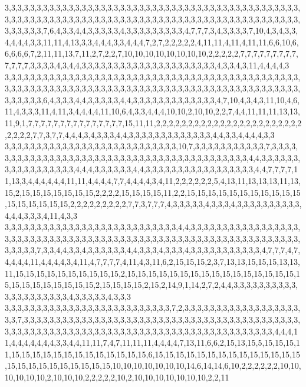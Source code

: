 3,3,3,3,3,3,3,3,3,3,3,3,3,3,3,3,3,3,3,3,3,3,3,3,3,3,3,3,3,3,3,3,3,3,3,3,3,3,3,3,3,3,3,3,3,3,3,3,3,3,3,3,3,3,3,3,3,3,3,3,3,3,3,3,3,3,3,3,3,3,3,3,3,3,3,3,3,3,3,3,3,3,3,3,3,3,3,3,3,3,3,3,3,3,3,3,3,3,7,6,4,3,3,4,4,3,3,3,3,3,4,3,3,3,3,3,3,3,3,3,4,7,7,7,3,4,3,3,3,3,7,10,4,3,4,3,3,4,4,4,4,3,3,11,11,4,13,3,3,4,4,4,3,3,4,4,4,7,2,7,2,2,2,2,2,4,11,11,4,11,4,11,11,6,6,10,6,6,6,6,6,7,2,11,11,13,7,11,2,7,2,2,7,10,10,10,10,10,10,10,10,2,2,2,2,2,7,7,7,7,7,7,7,7,7,7,7,7,7,3,3,3,3,4,3,4,4,3,3,3,3,3,3,3,3,3,3,3,3,3,3,3,3,3,3,3,3,3,4,3,3,4,3,11,4,4,4,4,3
3,3,3,3,3,3,3,3,3,3,3,3,3,3,3,3,3,3,3,3,3,3,3,3,3,3,3,3,3,3,3,3,3,3,3,3,3,3,3,3,3,3,3,3,3,3,3,3,3,3,3,3,3,3,3,3,3,3,3,3,3,3,3,3,3,3,3,3,3,3,3,3,3,3,3,3,3,3,3,3,3,3,3,3,3,3,3,3,3,3,3,3,3,3,3,3,3,3,6,4,3,3,3,4,4,3,3,3,3,3,4,4,3,3,3,3,3,3,3,3,3,3,3,3,3,4,7,10,4,3,4,3,11,10,4,6,11,4,3,3,3,11,4,11,3,4,4,4,4,11,10,6,4,3,3,4,4,4,10,10,2,10,10,2,2,7,4,4,11,11,11,13,13,11,9,1,7,7,7,7,7,7,7,7,7,7,7,7,7,7,7,15,11,11,2,2,2,2,2,2,2,2,2,2,2,2,2,2,2,2,2,2,2,2,2,2,2,2,2,2,2,7,7,3,7,7,4,4,4,3,4,3,3,3,4,4,3,3,3,3,3,3,3,3,3,3,3,3,3,4,4,3,3,4,4,4,4,3,3
3,3,3,3,3,3,3,3,3,3,3,3,3,3,3,3,3,3,3,3,3,3,3,3,3,3,3,10,7,3,3,3,3,3,3,3,3,3,3,3,7,3,3,3,3,3,3,3,3,3,3,3,3,3,3,3,3,3,3,3,3,3,3,3,3,3,3,3,3,3,3,3,3,3,3,3,3,3,3,3,3,3,3,4,4,3,3,3,3,3,3,3,3,3,3,3,3,3,3,3,3,3,4,4,4,3,3,3,3,3,3,4,4,3,3,3,3,3,3,3,3,3,3,3,3,3,3,3,3,3,4,4,7,7,7,7,11,13,3,4,4,4,4,4,4,11,11,4,4,4,4,7,7,4,4,4,4,3,4,11,2,2,2,2,2,2,5,4,13,11,13,13,13,11,13,15,2,15,15,15,15,15,15,15,2,2,2,2,15,15,15,15,11,2,2,15,15,15,15,15,15,15,15,15,15,15,15,15,15,15,15,15,2,2,2,2,2,2,2,2,2,7,7,3,7,7,7,4,3,3,3,3,3,4,3,3,3,4,3,3,3,3,3,3,3,3,3,3,4,4,4,3,3,3,4,11,4,3,3
3,3,3,3,3,3,3,3,3,3,3,3,3,3,3,3,3,3,3,3,3,3,3,3,3,3,3,4,4,3,3,3,3,3,3,3,3,3,3,3,3,3,3,3,3,3,3,3,3,3,3,3,3,3,3,3,3,3,3,3,3,3,3,3,3,3,3,3,3,3,3,3,3,3,3,3,3,3,3,3,3,3,3,3,3,3,3,3,3,3,3,3,3,3,3,3,3,7,3,3,4,4,3,3,4,3,3,3,3,3,3,4,4,3,3,3,4,3,3,3,4,3,3,3,3,3,3,3,3,3,3,3,4,7,7,7,4,7,4,4,4,4,11,4,4,4,4,3,4,11,4,7,7,7,7,4,11,4,3,11,6,2,15,15,15,2,3,7,13,13,15,15,15,13,13,11,15,15,15,15,15,15,15,15,15,15,2,15,15,15,15,15,15,15,15,15,15,15,15,15,15,15,15,15,15,15,15,15,15,15,15,15,2,15,15,15,15,2,15,2,14,9,1,14,2,7,2,4,4,3,3,3,3,3,3,3,3,3,3,3,3,3,3,3,3,3,3,3,3,4,3,3,3,3,3,4,3,3,3
3,3,3,3,3,3,3,3,3,3,3,3,3,3,3,3,3,3,3,3,3,3,3,3,3,3,7,2,3,3,3,3,3,3,3,3,3,3,3,3,3,3,3,3,3,3,3,3,7,3,3,3,3,3,3,3,3,3,3,3,3,3,3,3,3,3,3,3,3,3,3,3,3,3,3,3,3,3,3,3,3,3,3,3,3,3,3,3,3,3,3,3,3,3,3,3,3,3,3,3,3,3,3,3,3,3,3,3,3,3,3,3,3,3,3,3,3,3,3,3,3,3,3,3,3,3,3,3,3,3,3,3,3,3,4,4,4,11,4,4,4,4,4,4,4,3,3,4,4,11,11,7,4,7,11,11,11,4,4,4,4,7,13,11,6,6,2,15,13,15,5,15,15,15,11,15,15,15,15,15,15,15,15,15,15,15,15,15,6,15,15,15,15,15,15,15,15,15,15,15,15,15,15,15,15,15,15,15,15,15,15,15,15,10,10,10,10,10,10,10,14,6,14,14,6,10,2,2,2,2,2,2,10,10,10,10,10,10,2,10,10,10,2,2,2,2,2,10,2,10,10,10,10,10,10,10,2,2,11

